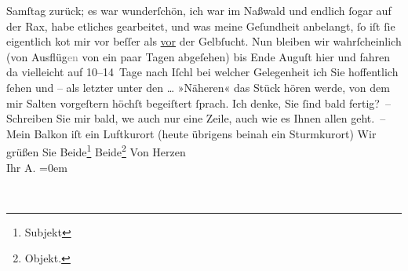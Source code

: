 \begin{ledgroupsized}[t]{13cm}
                  Samſtag zurück; es war wunderſchön, {\pb}ich war im Naßwald und endlich ſogar auf der
               Rax, habe etliches gearbeitet, und was meine
               Geſundheit anbelangt, ſo iſt ſie eigentlich ko{\geminationm}t mir vor
               beſſer als \uline{vor} der Gelbſucht. Nun bleiben wir
               wahrſcheinlich (\introOben{}von\introOben{} Ausflüg\textcolor{gray}{en} von ein
               paar Tagen abge{\pb}ſehen) bis Ende Auguſt
               hier und fahren da{\geminationn} vielleicht auf 10–14 Tage nach Iſchl bei welcher Gelegenheit ich Sie hoffentlich
               ſehen und – als letzter unter den {\dots} »Näheren« das Stück hören werde, von dem mir
                  Salten vorgeſtern höchſt begeiſtert ſprach.
               Ich denke, {\pb}Sie ſind bald fertig? –\pend
           \pstart
           Schreiben Sie mir bald, we{\geminationn} auch nur eine Zeile, auch
               wie es Ihnen allen geht. –\pend
           \pstart
           Mein Balkon iſt ein Luftkurort (heute übrigens beinah ein Sturmkurort)\pend
           \pstart
           Wir grüßen Sie Beide\footnote{\noindent{}Subjekt} Beide\footnote{\noindent{}Objekt.}\pend
           \pstart
           Von Herzen{\\[\baselineskip]}Ihr \spacefill\mbox{A.}\pend
           \leftskip=0em{}
         
         \endnumbering{}\end{ledgroupsized}  \newcommand{\dateiname}{L01420}\newcommand{\titel}{Arthur Schnitzler an Richard Beer-Hofmann, 28. 7. 1904}\newcommand{\editorInnen}{Martin Anton Müller und Gerd-Hermann Susen}
      